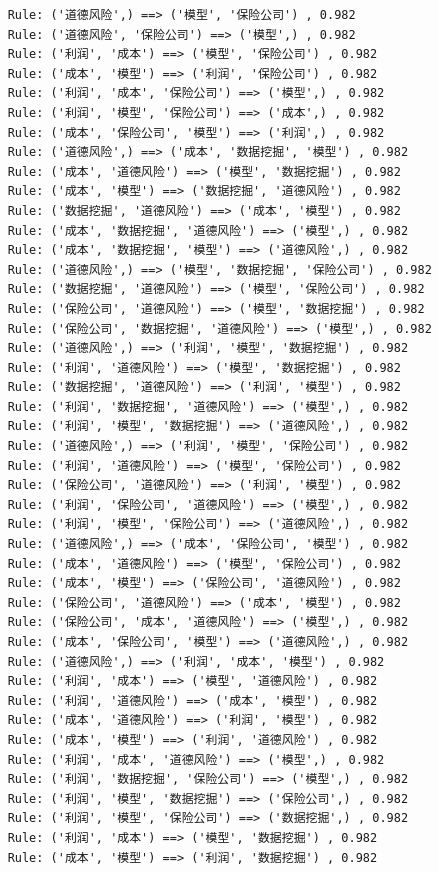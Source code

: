 \documentclass[lang=cn,11pt,a4paper,cite=authoryear]{elegantpaper}
\begin{document}
\begin{lstlisting}
	Rule: ('道德风险',) ==> ('模型', '保险公司') , 0.982
	Rule: ('道德风险', '保险公司') ==> ('模型',) , 0.982
	Rule: ('利润', '成本') ==> ('模型', '保险公司') , 0.982
	Rule: ('成本', '模型') ==> ('利润', '保险公司') , 0.982
	Rule: ('利润', '成本', '保险公司') ==> ('模型',) , 0.982
	Rule: ('利润', '模型', '保险公司') ==> ('成本',) , 0.982
	Rule: ('成本', '保险公司', '模型') ==> ('利润',) , 0.982
	Rule: ('道德风险',) ==> ('成本', '数据挖掘', '模型') , 0.982
	Rule: ('成本', '道德风险') ==> ('模型', '数据挖掘') , 0.982
	Rule: ('成本', '模型') ==> ('数据挖掘', '道德风险') , 0.982
	Rule: ('数据挖掘', '道德风险') ==> ('成本', '模型') , 0.982
	Rule: ('成本', '数据挖掘', '道德风险') ==> ('模型',) , 0.982
	Rule: ('成本', '数据挖掘', '模型') ==> ('道德风险',) , 0.982
	Rule: ('道德风险',) ==> ('模型', '数据挖掘', '保险公司') , 0.982
	Rule: ('数据挖掘', '道德风险') ==> ('模型', '保险公司') , 0.982
	Rule: ('保险公司', '道德风险') ==> ('模型', '数据挖掘') , 0.982
	Rule: ('保险公司', '数据挖掘', '道德风险') ==> ('模型',) , 0.982
	Rule: ('道德风险',) ==> ('利润', '模型', '数据挖掘') , 0.982
	Rule: ('利润', '道德风险') ==> ('模型', '数据挖掘') , 0.982
	Rule: ('数据挖掘', '道德风险') ==> ('利润', '模型') , 0.982
	Rule: ('利润', '数据挖掘', '道德风险') ==> ('模型',) , 0.982
	Rule: ('利润', '模型', '数据挖掘') ==> ('道德风险',) , 0.982
	Rule: ('道德风险',) ==> ('利润', '模型', '保险公司') , 0.982
	Rule: ('利润', '道德风险') ==> ('模型', '保险公司') , 0.982
	Rule: ('保险公司', '道德风险') ==> ('利润', '模型') , 0.982
	Rule: ('利润', '保险公司', '道德风险') ==> ('模型',) , 0.982
	Rule: ('利润', '模型', '保险公司') ==> ('道德风险',) , 0.982
	Rule: ('道德风险',) ==> ('成本', '保险公司', '模型') , 0.982
	Rule: ('成本', '道德风险') ==> ('模型', '保险公司') , 0.982
	Rule: ('成本', '模型') ==> ('保险公司', '道德风险') , 0.982
	Rule: ('保险公司', '道德风险') ==> ('成本', '模型') , 0.982
	Rule: ('保险公司', '成本', '道德风险') ==> ('模型',) , 0.982
	Rule: ('成本', '保险公司', '模型') ==> ('道德风险',) , 0.982
	Rule: ('道德风险',) ==> ('利润', '成本', '模型') , 0.982
	Rule: ('利润', '成本') ==> ('模型', '道德风险') , 0.982
	Rule: ('利润', '道德风险') ==> ('成本', '模型') , 0.982
	Rule: ('成本', '道德风险') ==> ('利润', '模型') , 0.982
	Rule: ('成本', '模型') ==> ('利润', '道德风险') , 0.982
	Rule: ('利润', '成本', '道德风险') ==> ('模型',) , 0.982
	Rule: ('利润', '数据挖掘', '保险公司') ==> ('模型',) , 0.982
	Rule: ('利润', '模型', '数据挖掘') ==> ('保险公司',) , 0.982
	Rule: ('利润', '模型', '保险公司') ==> ('数据挖掘',) , 0.982
	Rule: ('利润', '成本') ==> ('模型', '数据挖掘') , 0.982
	Rule: ('成本', '模型') ==> ('利润', '数据挖掘') , 0.982

\end{lstlisting}
\end{document}
